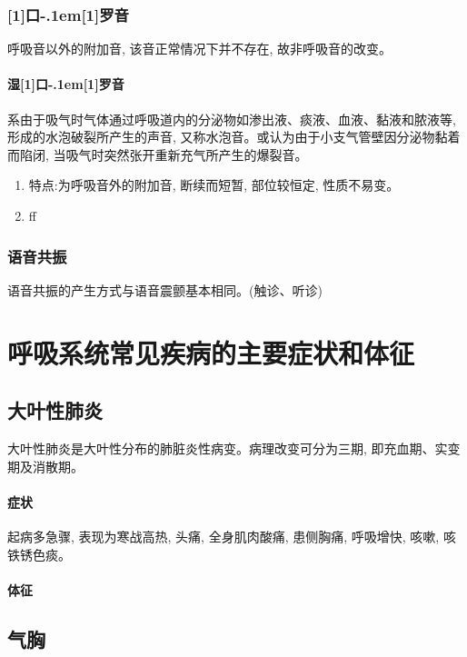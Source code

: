 \documentclass[UTF8]{ctexbook}
\newcommand{\kouluo}{\hbox{\scalebox{0.45}[1]{口}\kern-.1em\scalebox{0.6}[1]{罗}}}
\begin{document}
\subsubsection{\kouluo 音}

呼吸音以外的附加音, 该音正常情况下并不存在, 故非呼吸音的改变。

\paragraph{湿\kouluo 音}系由于吸气时气体通过呼吸道内的分泌物如渗出液、痰液、血液、黏液和脓液等, 形成的水泡破裂所产生的声音, 又称水泡音。或认为由于小支气管壁因分泌物黏着而陷闭, 当吸气时突然张开重新充气所产生的爆裂音。

\begin{enumerate}[(1)]
    \item 特点:为呼吸音外的附加音, 断续而短暂, 部位较恒定, 性质不易变。
    \item ff
\end{enumerate}

\subsubsection{语音共振}
语音共振的产生方式与语音震颤基本相同。(触诊、听诊)

\section{呼吸系统常见疾病的主要症状和体征}
\subsection{大叶性肺炎}
大叶性肺炎是大叶性分布的肺脏炎性病变。病理改变可分为三期, 即充血期、实变期及消散期。

\paragraph{症状}起病多急骤, 表现为寒战高热, 头痛, 全身肌肉酸痛, 患侧胸痛, 呼吸增快, 咳嗽, 咳铁锈色痰。

\paragraph{体征}
\subsection{气胸}
\end{document}

